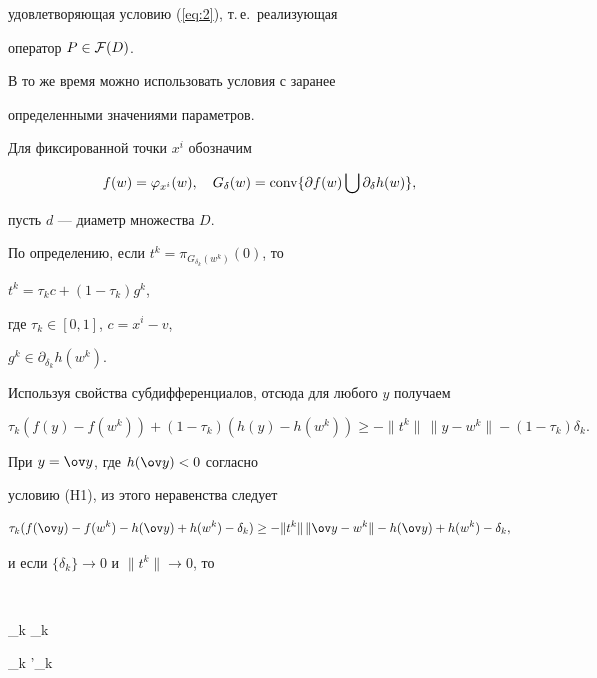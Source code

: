  удовлетворяющая условию (\ref{eq:2}), т.\,е.~реализующая


оператор $P \in {\cal F} (D)$.





 В то же время можно использовать условия с заранее


определенными значениями параметров.


Для фиксированной точки $x^{i}$ обозначим


$$


 f(w) = \varphi_{x^{i}}(w),\quad


 G_{\delta}(w) =\conv


 \{ \partial f(w) \bigcup \partial _{\delta} h(w) \},


$$


пусть $d$ --- диаметр множества $D$.


По определению, если $t^{k} = \pi_{G_{\delta_{k}}(w^{k})}(0)$, то


$t^{k} = \tau_{k} c +(1-\tau_{k}) g^{k}$,


где $ \tau_{k} \in [0,1]$, $c=x^{i}-v$,


$g^{k} \in \partial _{\delta_{k}} h(w^{k})$.


 Используя свойства субдифференциалов, отсюда для любого $y$ получаем


\begin{equation} \label{eq:7}


 \tau _{k} ( f(y) -f(w^{k})) + (1- \tau _{k}) ( h(y) -h(w^{k})) \geq


  - \| t^{k}\|\, \| y - w^{k}\| - (1- \tau _{k}) \delta _{k}.


\end{equation}


При $y=\ov y $, где $h (\ov y) <0$ согласно


условию (H1), из этого неравенства следует


$$


 \tau _{k} ( f(\ov y) - f(w^{k}) - h (\ov y) + h(w^{k})- \delta _{k})


 \geq - \| t^{k}\|\, \| \ov y - w^{k}\| - h (\ov y) + h(w^{k})- \delta _{k},


$$


и если $\{\delta _{k} \} \to 0 $ и $\| t^{k} \| \to 0$, то


$$


 \liminf _{k \to \infty} \tau_{k} \geq


 \liminf _{k \to \infty} \tau'_{k} \geq


